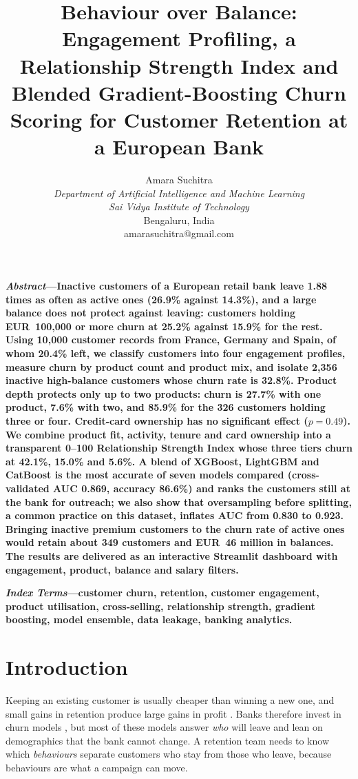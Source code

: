 \documentclass[10pt,twocolumn,letterpaper]{article}
\title{Behaviour over Balance: Engagement Profiling, a Relationship Strength Index and Blended Gradient-Boosting Churn Scoring for Customer Retention at a European Bank}
\author{%
\begin{tabular}{c}
Amara Suchitra\\
\textit{Department of Artificial Intelligence and Machine Learning}\\
\textit{Sai Vidya Institute of Technology}\\
Bengaluru, India\\
amarasuchitra@gmail.com
\end{tabular}}
\date{}
\begin{document}
\maketitle

\noindent\textbf{\textit{Abstract}---Inactive customers of a European retail bank leave 1.88 times as often as active ones (26.9\% against 14.3\%), and a large balance does not protect against leaving: customers holding EUR~100,000 or more churn at 25.2\% against 15.9\% for the rest. Using 10,000 customer records from France, Germany and Spain, of whom 20.4\% left, we classify customers into four engagement profiles, measure churn by product count and product mix, and isolate 2,356 inactive high-balance customers whose churn rate is 32.8\%. Product depth protects only up to two products: churn is 27.7\% with one product, 7.6\% with two, and 85.9\% for the 326 customers holding three or four. Credit-card ownership has no significant effect ($p = 0.49$). We combine product fit, activity, tenure and card ownership into a transparent 0--100 Relationship Strength Index whose three tiers churn at 42.1\%, 15.0\% and 5.6\%. A blend of XGBoost, LightGBM and CatBoost is the most accurate of seven models compared (cross-validated AUC 0.869, accuracy 86.6\%) and ranks the customers still at the bank for outreach; we also show that oversampling before splitting, a common practice on this dataset, inflates AUC from 0.830 to 0.923. Bringing inactive premium customers to the churn rate of active ones would retain about 349 customers and EUR~46 million in balances. The results are delivered as an interactive Streamlit dashboard with engagement, product, balance and salary filters.}

\vspace{0.5em}
\noindent\textbf{\textit{Index Terms}---customer churn, retention, customer engagement, product utilisation, cross-selling, relationship strength, gradient boosting, model ensemble, data leakage, banking analytics.}

\section{Introduction}
Keeping an existing customer is usually cheaper than winning a new one, and small gains in retention produce large gains in profit \cite{reichheld,gupta}. Banks therefore invest in churn models \cite{neslin,verbeke,xie}, but most of these models answer \emph{who} will leave and lean on demographics that the bank cannot change. A retention team needs to know which \emph{behaviours} separate customers who stay from those who leave, because behaviours are what a campaign can move.
\end{document}
